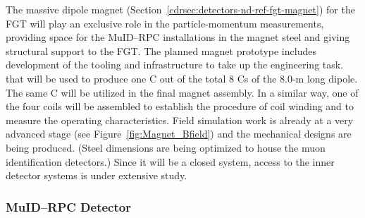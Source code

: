 The massive dipole magnet (Section~\ref{cdrsec:detectors-nd-ref-fgt-magnet}) for the FGT will
play an exclusive  role in the particle-momentum measurements,
providing space for the MuID--RPC installations in the magnet steel
and giving structural support to the FGT. 
The planned magnet prototype
includes development of the tooling and
infrastructure to take up the engineering task. 
that will be used to produce one C out of the total 8 Cs of the
8.0-m long dipole.  The same C will be utilized in the final magnet
assembly. In a similar way, one of the four coils %
will be assembled
 to establish the procedure of coil winding and to measure the
operating characteristics.  Field simulation work is already at a very
advanced stage (see Figure~\ref{fig:Magnet_Bfield}) and the mechanical
designs are being produced.  (Steel dimensions are being optimized to house the muon
identification detectors.) Since it will be a
closed system, access to the inner detector systems is under extensive
study. %


\subsubsection{MuID--RPC Detector}

